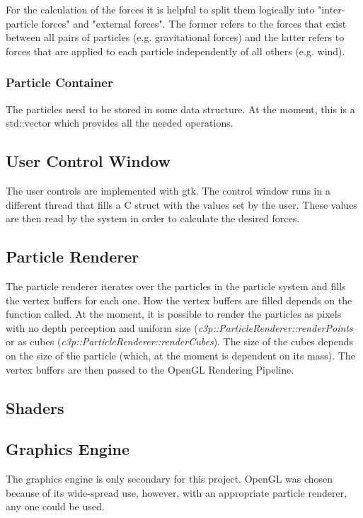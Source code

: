 \documentclass[runningheads,a4paper]{llncs}
\begin{document}
For the calculation of the forces it is helpful to split them logically into "inter-particle forces" and "external forces". The former refers to the forces that exist between all pairs of particles (e.g. gravitational forces) and the latter refers to forces that are applied to each particle independently of all others (e.g. wind).



\subsubsection{Particle Container}
The particles need to be stored in some data structure. At the moment, this is a std::vector which provides all the needed operations.

\subsection{User Control Window}
The user controls are implemented with gtk. The control window runs in a different thread that fills a C struct with the values set by the user. These values are then read by the system in order to calculate the desired forces.

\subsection{Particle Renderer}
The particle renderer iterates over the particles in the particle system and fills the vertex buffers for each one. How the vertex buffers are filled depends on the function called. At the moment, it is possible to render the particles as pixels with no depth perception and uniform size (\emph{c3p::ParticleRenderer::renderPoints}
or as cubes (\emph{c3p::ParticleRenderer::renderCubes}). The size of the cubes depends on the size of the particle (which, at the moment is dependent on its mass). The vertex buffers are then passed to the OpenGL Rendering Pipeline.

\subsection{Shaders}

\subsection{Graphics Engine}
The graphics engine is only secondary for this project. OpenGL was chosen because of its wide-spread use, however, with an appropriate particle renderer, any one could be used.
\end{document}
